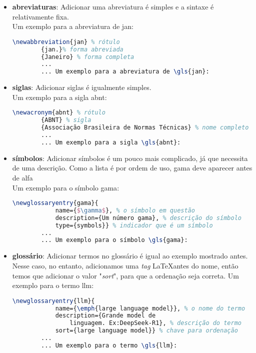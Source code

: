 \begin{itemize}
	\item \textbf{abreviaturas}: Adicionar uma abreviatura é simples e a sintaxe é relativamente fixa.\\ Um exemplo para a abreviatura de \gls{jan}:
		\begin{lstlisting}[language=tex]
		\newabbreviation{jan} % rótulo
		{jan.}% forma abreviada
		{Janeiro} % forma completa
		...
		... Um exemplo para a abreviatura de \gls{jan}:
		\end{lstlisting}
	
	\item \textbf{siglas}: Adicionar siglas é igualmente simples.\\ 
	Um exemplo para a sigla \gls{abnt}:
	\begin{lstlisting}[language=tex]
		\newacronym{abnt} % rótulo
		{ABNT} % sigla
		{Associação Brasileira de Normas Técnicas} % nome completo
		...
		... Um exemplo para a sigla \gls{abnt}:
	\end{lstlisting}
	
	\item \textbf{símbolos}: Adicionar símbolos é um pouco mais complicado, já que necessita de uma descrição. Como a lista é por ordem de uso, \gls{gama} deve aparecer antes de \gls{alfa}\\ 
	Um exemplo para o símbolo \gls{gama}:
	\begin{lstlisting}[language=tex]
		\newglossaryentry{gama}{
			name={$\gamma$}, % o símbolo em questão
			description={Um número gama}, % descrição do símbolo
			type={symbols}} % indicador que é um símbolo
		...
		... Um exemplo para o símbolo \gls{gama}:
	\end{lstlisting}
	
	\item \textbf{glossário}: Adicionar termos no glossário é igual ao exemplo mostrado antes.\\
	Nesse caso, no entanto, adicionamos uma \emph{tag} \LaTeX antes do nome, então temos que adicionar o valor "\emph{sort}", para que a ordenação seja correta.
	Um exemplo para o termo \gls{llm}:
	\begin{lstlisting}[language=tex]
		\newglossaryentry{llm}{
			name={\emph{large language model}}, % o nome do termo
			description={Grande model de 
				linguagem. Ex:DeepSeek-R1}, % descrição do termo
			sort={large language model}} % chave para ordenação
		...
		... Um exemplo para o termo \gls{llm}:
	\end{lstlisting}
	

\end{itemize}
